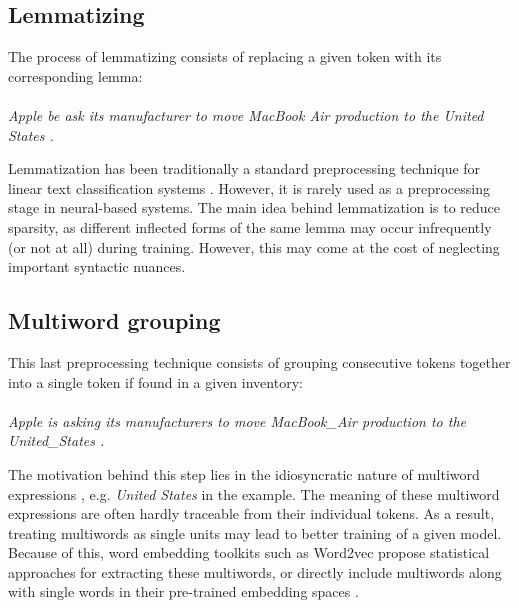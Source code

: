 \documentclass[11pt,a4paper]{article}
\begin{document}
\subsection{Lemmatizing}
\label{lemmatizing}


The process of lemmatizing consists of replacing a given token with its corresponding lemma: 

\paragraph{} 
\textit{Apple be ask its manufacturer to move MacBook Air production to the United States .}
\newline

Lemmatization has been traditionally a standard preprocessing technique for linear text classification systems \cite{mullen2004sentiment,toman2006influence,hassan2007random}. However, it is rarely used as a preprocessing stage in neural-based systems. The main idea behind lemmatization is to reduce sparsity, as different inflected forms of the same lemma may occur infrequently (or not at all) during training. However, this may come at the cost of neglecting important syntactic nuances.

\subsection{Multiword grouping}
\label{multiwords}

This last preprocessing technique consists of grouping consecutive tokens together into a single token if found in a given inventory: 


\paragraph{} 
\textit{Apple is asking its manufacturers to move MacBook\_Air production to the United\_States .}
\newline

The motivation behind this step lies in the idiosyncratic nature of multiword expressions \cite{sag2002multiword}, e.g. \textit{United States} in the example. The meaning of these multiword expressions are often hardly traceable from their individual tokens. As a result, treating multiwords as single units may lead to better training of a given model. Because of this, word embedding toolkits such as Word2vec propose statistical approaches for extracting these multiwords, or directly include multiwords along with single words in their pre-trained embedding spaces \cite{mikolov2013distributed}.
\end{document}
